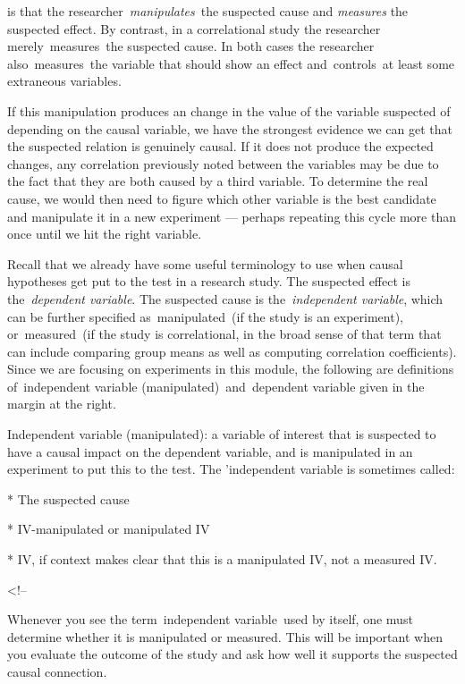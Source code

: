 \begin{refsection}
 is that the researcher \emph{manipulates} the suspected cause and \emph{measures} the suspected effect. By contrast, in a correlational study the researcher merely measures the suspected cause. In both cases the researcher also measures the variable that should show an effect and controls at least some extraneous variables. 

If this manipulation produces an change in the value of the variable suspected of depending on the causal variable, we have the strongest evidence we can get that the suspected relation is genuinely causal. If it does not produce the expected changes, any correlation previously noted between the variables may be due to the fact that they are both caused by a third variable. To determine the real cause, we would then need to figure which other variable is the best candidate and manipulate it in a new experiment --- perhaps repeating this cycle more than once until we hit the right variable.

Recall that we already have some useful terminology to use when causal hypotheses get put to the test in a research study. The suspected effect is the \emph{dependent variable}. The suspected cause is the \emph{independent variable}, which can be further specified as manipulated (if the study is an experiment), or measured (if the study is correlational, in the broad sense of that term that can include comparing group means as well as computing correlation coefficients). Since we are focusing on experiments in this module, the following are definitions of independent variable (manipulated) and dependent variable given in the margin at the right.

\begin{thesis}
Independent variable (manipulated): a variable of interest that is suspected to have a causal impact on the dependent variable, and is manipulated in an experiment to put this to the test.
The 'independent variable is sometimes called:

* The suspected cause

* IV-manipulated or manipulated IV

* IV, if context makes clear that this is a manipulated IV, not a measured IV.

<!--\end{thesis}

Whenever you see the term independent variable used by itself, one must determine whether it is manipulated or measured. This will be important when you evaluate the outcome of the study and ask how well it supports the suspected causal connection.


\end{refsection}
